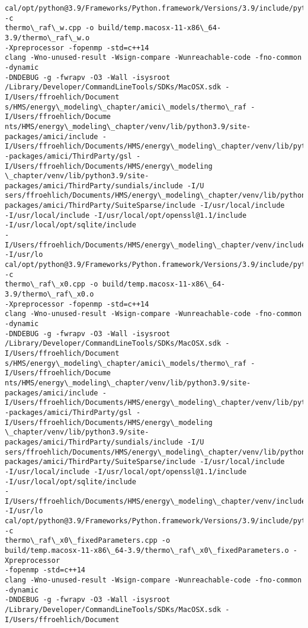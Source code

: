 \documentclass[11pt]{article}
\begin{document}
\begin{Verbatim}[commandchars=\\\{\}]
cal/opt/python@3.9/Frameworks/Python.framework/Versions/3.9/include/python3.9 -c
thermo\_raf\_w.cpp -o build/temp.macosx-11-x86\_64-3.9/thermo\_raf\_w.o
-Xpreprocessor -fopenmp -std=c++14
clang -Wno-unused-result -Wsign-compare -Wunreachable-code -fno-common -dynamic
-DNDEBUG -g -fwrapv -O3 -Wall -isysroot
/Library/Developer/CommandLineTools/SDKs/MacOSX.sdk -I/Users/ffroehlich/Document
s/HMS/energy\_modeling\_chapter/amici\_models/thermo\_raf -I/Users/ffroehlich/Docume
nts/HMS/energy\_modeling\_chapter/venv/lib/python3.9/site-packages/amici/include -
I/Users/ffroehlich/Documents/HMS/energy\_modeling\_chapter/venv/lib/python3.9/site
-packages/amici/ThirdParty/gsl -I/Users/ffroehlich/Documents/HMS/energy\_modeling
\_chapter/venv/lib/python3.9/site-packages/amici/ThirdParty/sundials/include -I/U
sers/ffroehlich/Documents/HMS/energy\_modeling\_chapter/venv/lib/python3.9/site-
packages/amici/ThirdParty/SuiteSparse/include -I/usr/local/include
-I/usr/local/include -I/usr/local/opt/openssl@1.1/include
-I/usr/local/opt/sqlite/include
-I/Users/ffroehlich/Documents/HMS/energy\_modeling\_chapter/venv/include -I/usr/lo
cal/opt/python@3.9/Frameworks/Python.framework/Versions/3.9/include/python3.9 -c
thermo\_raf\_x0.cpp -o build/temp.macosx-11-x86\_64-3.9/thermo\_raf\_x0.o
-Xpreprocessor -fopenmp -std=c++14
clang -Wno-unused-result -Wsign-compare -Wunreachable-code -fno-common -dynamic
-DNDEBUG -g -fwrapv -O3 -Wall -isysroot
/Library/Developer/CommandLineTools/SDKs/MacOSX.sdk -I/Users/ffroehlich/Document
s/HMS/energy\_modeling\_chapter/amici\_models/thermo\_raf -I/Users/ffroehlich/Docume
nts/HMS/energy\_modeling\_chapter/venv/lib/python3.9/site-packages/amici/include -
I/Users/ffroehlich/Documents/HMS/energy\_modeling\_chapter/venv/lib/python3.9/site
-packages/amici/ThirdParty/gsl -I/Users/ffroehlich/Documents/HMS/energy\_modeling
\_chapter/venv/lib/python3.9/site-packages/amici/ThirdParty/sundials/include -I/U
sers/ffroehlich/Documents/HMS/energy\_modeling\_chapter/venv/lib/python3.9/site-
packages/amici/ThirdParty/SuiteSparse/include -I/usr/local/include
-I/usr/local/include -I/usr/local/opt/openssl@1.1/include
-I/usr/local/opt/sqlite/include
-I/Users/ffroehlich/Documents/HMS/energy\_modeling\_chapter/venv/include -I/usr/lo
cal/opt/python@3.9/Frameworks/Python.framework/Versions/3.9/include/python3.9 -c
thermo\_raf\_x0\_fixedParameters.cpp -o
build/temp.macosx-11-x86\_64-3.9/thermo\_raf\_x0\_fixedParameters.o -Xpreprocessor
-fopenmp -std=c++14
clang -Wno-unused-result -Wsign-compare -Wunreachable-code -fno-common -dynamic
-DNDEBUG -g -fwrapv -O3 -Wall -isysroot
/Library/Developer/CommandLineTools/SDKs/MacOSX.sdk -I/Users/ffroehlich/Document

\end{Verbatim}
\end{document}
